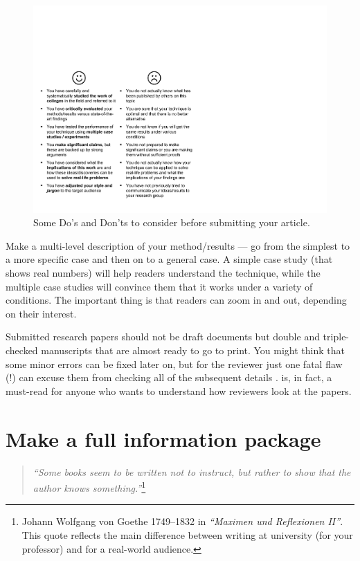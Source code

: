 \documentclass[graybox,envcountchap,sectrefs,UStrade]{svmono}
\begin{document}
\begin{figure}[htb]
\begin{center}
\includegraphics[width=\textwidth]{Fig_checklist.pdf}
\caption{Some Do's and Don'ts to consider before submitting your article.} \label{F:dos}
\end{center}
\end{figure}

Make a multi-level description of your method/results --- go from the simplest to a more specific case and then on to a general case. A simple case study (that shows real numbers) will help readers understand the technique, while the multiple case studies will convince them that it works under a variety of conditions. The important thing is that readers can zoom in and out, depending on their interest.\par

Submitted research papers should not be draft documents but double and triple-checked manuscripts that are almost ready to go to print. You might think that some minor errors can be fixed later on, but for the reviewer just one fatal flaw (!) can excuse them from checking all of the subsequent details \citep{Smith1990TR}. \citet{Smith1990TR} is, in fact, a must-read for anyone who wants to understand how reviewers look at the papers.\par

\newpage

 \section{Make a full information package}

\begin{quote}
    \emph{``Some books seem to be written not to instruct, but rather to show that the author knows something.''}\footnote{Johann Wolfgang von Goethe 1749--1832 in \emph{``Maximen und Reflexionen II''}. This quote reflects the main difference between writing at university (for your professor) and for a real-world audience.}
\end{quote}
\end{document}
